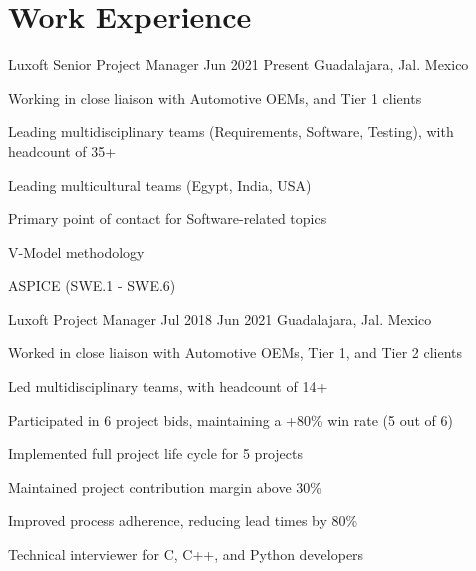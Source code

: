 
\section{Work Experience}

\job
    {Luxoft}
    {Senior Project Manager}
    {Jun 2021}
    {Present}
    {Guadalajara, Jal. Mexico}
    {
        \begin{itemize-bullets}
            \item{Working in close liaison with Automotive OEMs, and Tier 1 clients}
            \item{Leading multidisciplinary teams (Requirements, Software, Testing), with headcount of 35+}
            \item{Leading multicultural teams (Egypt, India, USA)}
            \item{Primary point of contact for Software-related topics}
            \item{V-Model methodology}
            \item{ASPICE (SWE.1 - SWE.6)}
        \end{itemize-bullets}
    }


\job
    {Luxoft}
    {Project Manager}
    {Jul 2018}
    {Jun 2021}
    {Guadalajara, Jal. Mexico}
    {
        \begin{itemize-bullets}
            \item{Worked in close liaison with Automotive OEMs, Tier 1, and Tier 2 clients}
            \item{Led multidisciplinary teams, with headcount of 14+}
            \item{Participated in 6 project bids, maintaining a +80\% win rate (5 out of 6)}
            \item{Implemented full project life cycle for 5 projects}
            \item{Maintained project contribution margin above 30\% }
            \item{Improved process adherence, reducing lead times by 80\%}
            \item{Technical interviewer for C, C++, and Python developers}
        \end{itemize-bullets}
    }


